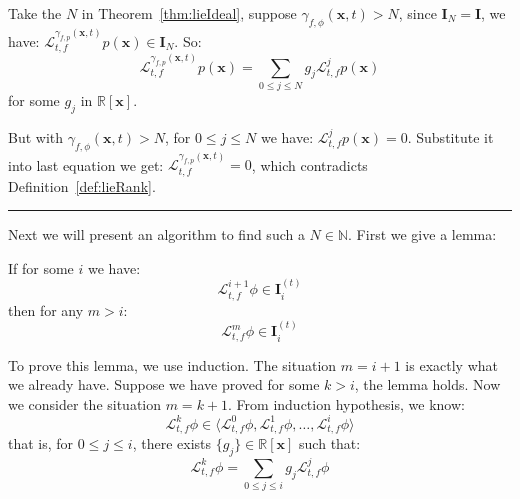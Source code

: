 \documentclass{jssc}
\newcommand{\rulex}{\hfill\rule{1mm}{3mm}}
\begin{document}
Take the $N$ in Theorem~\ref{thm:lieIdeal}, suppose $\gamma_{f, \phi}(\boldsymbol{x}, t) > N$, since $\boldsymbol{I}_N = \boldsymbol{I}$, we have:  $\mathcal{L}_{t, f}^{\gamma_{f, p}(\boldsymbol{x}, t)} p(\boldsymbol{x}) \in \boldsymbol{I}_N$. So:
\begin{equation*}
	 \mathcal{L}_{t, f}^{\gamma_{f, p}(\boldsymbol{x}, t)} p(\boldsymbol{x}) = \sum_{0 \leq j \leq N} g_j \mathcal{L}_{t, f}^j p(\boldsymbol{x})
\end{equation*}
for some $g_j$ in $\mathbb{R}[\boldsymbol{x}]$.

But with $\gamma_{f, \phi}(\boldsymbol{x}, t) > N$, for $0 \leq j \leq N$ we have: $\mathcal{L}_{t, f}^j p(\boldsymbol{x}) = 0$. Substitute it into last equation we get:  $\mathcal{L}_{t, f}^{\gamma_{f, p}(\boldsymbol{x}, t)} = 0$, which contradicts Definition~\ref{def:lieRank}.
\rulex \newline

Next we will present an algorithm to find such a $N \in \mathbb{N}$. First we give a lemma:
\begin{lemma}
\label{lem:fixed}
If for some $i$ we have:
	\begin{equation*}
		\mathcal{L}_{t, f}^{i+1} \phi \in \boldsymbol{I}_i^{(t)}
	\end{equation*}
	then for any $m>i$:
	\begin{equation*}
		\mathcal{L}_{t, f}^{m} \phi \in \boldsymbol{I}_i^{(t)}
	\end{equation*}
\end{lemma}

\proof
To prove this lemma, we use induction. The situation $m = i+1$ is exactly what we already have. Suppose we have proved for some $k > i$, the lemma holds. Now we consider the situation $m = k+1$. From induction hypothesis, we know:
		\begin{equation*}
			\mathcal{L}_{t, f}^k \phi \in \langle \mathcal{L}_{t, f}^0 \phi, \mathcal{L}_{t, f}^1 \phi, \dots, \mathcal{L}_{t, f}^i \phi \rangle
		\end{equation*}
that is, for $0 \leq j \leq i$, there exists $\{ g_j \} \in \mathbb{R} [\boldsymbol{x}]$ such that:
		\begin{equation*}
			\mathcal{L}_{t, f}^k \phi = \sum_{0 \leq j \leq i} g_j \mathcal{L}_{t, f}^j \phi
		\end{equation*}
\end{document}

